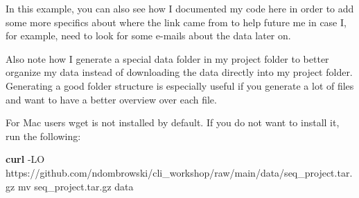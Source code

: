\documentclass[
  letterpaper,
  DIV=11,
  numbers=noendperiod]{scrreprt}
\newenvironment{Shaded}{}{}
\newcommand{\AttributeTok}[1]{\textcolor[rgb]{0.84,0.23,0.29}{#1}}
\newcommand{\ExtensionTok}[1]{\textcolor[rgb]{0.84,0.23,0.29}{\textbf{#1}}}
\newcommand{\FunctionTok}[1]{\textcolor[rgb]{0.44,0.26,0.76}{#1}}
\newcommand{\NormalTok}[1]{\textcolor[rgb]{0.14,0.16,0.18}{#1}}
\begin{document}
In this example, you can also see how I documented my code here in order
to add some more specifics about where the link came from to help future
me in case I, for example, need to look for some e-mails about the data
later on.

Also note how I generate a special data folder in my project folder to
better organize my data instead of downloading the data directly into my
project folder. Generating a good folder structure is especially useful
if you generate a lot of files and want to have a better overview over
each file.

\begin{tcolorbox}[enhanced jigsaw, breakable, left=2mm, opacitybacktitle=0.6, coltitle=black, toprule=.15mm, colframe=quarto-callout-important-color-frame, opacityback=0, bottomtitle=1mm, rightrule=.15mm, colback=white, toptitle=1mm, leftrule=.75mm, titlerule=0mm, bottomrule=.15mm, title=\textcolor{quarto-callout-important-color}{\faExclamation}\hspace{0.5em}{Wget for Mac users}, colbacktitle=quarto-callout-important-color!10!white, arc=.35mm]

For Mac users wget is not installed by default. If you do not want to
install it, run the following:

\begin{Shaded}
\begin{Highlighting}[]
\ExtensionTok{curl} \AttributeTok{{-}LO}\NormalTok{ https://github.com/ndombrowski/cli\_workshop/raw/main/data/seq\_project.tar.gz}
\FunctionTok{mv}\NormalTok{ seq\_project.tar.gz data}
\end{Highlighting}
\end{Shaded}

\end{tcolorbox}
\end{document}
